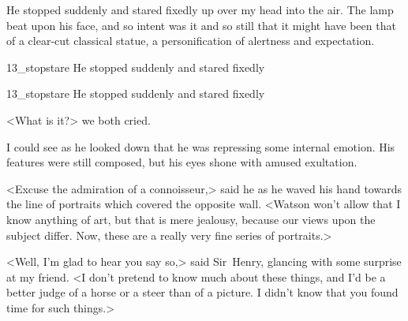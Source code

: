 He stopped suddenly and stared fixedly up over my head into the air. The lamp beat upon his face, and so intent was it and so still that it might have been that of a clear-cut classical statue, a personification of alertness and expectation.

\begin{letter}
	\begin{bwbigpic}
			[1.0]  
		{13_stopstare}
		{He stopped suddenly and stared fixedly}
	\end{bwbigpic}
\end{letter}
\begin{a4}
	\begin{bwbigpic}
			[1.0]  
		{13_stopstare}
		{He stopped suddenly and stared fixedly}
	\end{bwbigpic}
\end{a4}


<What is it?> we both cried.

I could see as he looked down that he was repressing some internal emotion. His features were still composed, but his eyes shone with amused exultation.

<Excuse the admiration of a connoisseur,> said he as he waved his hand towards the line of portraits which covered the opposite wall. <Watson won't allow that I know anything of art, but that is mere jealousy, because our views upon the subject differ. Now, these are a really very fine series of portraits.>

<Well, I'm glad to hear you say so,> said Sir~Henry, glancing with some surprise at my friend. <I don't pretend to know much about these things, and I'd be a better judge of a horse or a steer than of a picture. I didn't know that you found time for such things.>

